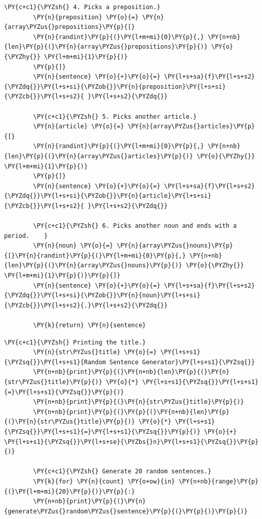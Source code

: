 \begin{tcolorbox}[breakable, size=fbox, boxrule=1pt, pad at break*=1mm,colback=cellbackground, colframe=cellborder]
\begin{Verbatim}[commandchars=\\\{\}]
		\PY{c+c1}{\PYZsh{} 4. Picks a preposition.}
		\PY{n}{preposition} \PY{o}{=} \PY{n}{array\PYZus{}prepositions}\PY{p}{[}
		\PY{n}{randint}\PY{p}{(}\PY{l+m+mi}{0}\PY{p}{,} \PY{n+nb}{len}\PY{p}{(}\PY{n}{array\PYZus{}prepositions}\PY{p}{)} \PY{o}{\PYZhy{}} \PY{l+m+mi}{1}\PY{p}{)}
		\PY{p}{]}
		\PY{n}{sentence} \PY{o}{+}\PY{o}{=} \PY{l+s+sa}{f}\PY{l+s+s2}{\PYZdq{}}\PY{l+s+si}{\PYZob{}}\PY{n}{preposition}\PY{l+s+si}{\PYZcb{}}\PY{l+s+s2}{ }\PY{l+s+s2}{\PYZdq{}}
		
		\PY{c+c1}{\PYZsh{} 5. Picks another article.}
		\PY{n}{article} \PY{o}{=} \PY{n}{array\PYZus{}articles}\PY{p}{[}
		\PY{n}{randint}\PY{p}{(}\PY{l+m+mi}{0}\PY{p}{,} \PY{n+nb}{len}\PY{p}{(}\PY{n}{array\PYZus{}articles}\PY{p}{)} \PY{o}{\PYZhy{}} \PY{l+m+mi}{1}\PY{p}{)}
		\PY{p}{]}
		\PY{n}{sentence} \PY{o}{+}\PY{o}{=} \PY{l+s+sa}{f}\PY{l+s+s2}{\PYZdq{}}\PY{l+s+si}{\PYZob{}}\PY{n}{article}\PY{l+s+si}{\PYZcb{}}\PY{l+s+s2}{ }\PY{l+s+s2}{\PYZdq{}}    
		
		\PY{c+c1}{\PYZsh{} 6. Picks another noun and ends with a period.    }
		\PY{n}{noun} \PY{o}{=} \PY{n}{array\PYZus{}nouns}\PY{p}{[}\PY{n}{randint}\PY{p}{(}\PY{l+m+mi}{0}\PY{p}{,} \PY{n+nb}{len}\PY{p}{(}\PY{n}{array\PYZus{}nouns}\PY{p}{)} \PY{o}{\PYZhy{}} \PY{l+m+mi}{1}\PY{p}{)}\PY{p}{]}
		\PY{n}{sentence} \PY{o}{+}\PY{o}{=} \PY{l+s+sa}{f}\PY{l+s+s2}{\PYZdq{}}\PY{l+s+si}{\PYZob{}}\PY{n}{noun}\PY{l+s+si}{\PYZcb{}}\PY{l+s+s2}{.}\PY{l+s+s2}{\PYZdq{}}    
		
		\PY{k}{return} \PY{n}{sentence}
	\end{Verbatim}
\end{tcolorbox}

\begin{tcolorbox}[breakable, size=fbox, boxrule=1pt, pad at break*=1mm,colback=cellbackground, colframe=cellborder]
	\begin{Verbatim}[commandchars=\\\{\}]
		\PY{c+c1}{\PYZsh{} Printing the title.}
		\PY{n}{str\PYZus{}title} \PY{o}{=} \PY{l+s+s1}{\PYZsq{}}\PY{l+s+s1}{Random Sentence Generator}\PY{l+s+s1}{\PYZsq{}}
		\PY{n+nb}{print}\PY{p}{(}\PY{n+nb}{len}\PY{p}{(}\PY{n}{str\PYZus{}title}\PY{p}{)} \PY{o}{*} \PY{l+s+s1}{\PYZsq{}}\PY{l+s+s1}{=}\PY{l+s+s1}{\PYZsq{}}\PY{p}{)}
		\PY{n+nb}{print}\PY{p}{(}\PY{n}{str\PYZus{}title}\PY{p}{)}
		\PY{n+nb}{print}\PY{p}{(}\PY{p}{(}\PY{n+nb}{len}\PY{p}{(}\PY{n}{str\PYZus{}title}\PY{p}{)} \PY{o}{*} \PY{l+s+s1}{\PYZsq{}}\PY{l+s+s1}{=}\PY{l+s+s1}{\PYZsq{}}\PY{p}{)} \PY{o}{+} \PY{l+s+s1}{\PYZsq{}}\PY{l+s+se}{\PYZbs{}n}\PY{l+s+s1}{\PYZsq{}}\PY{p}{)}
		
		\PY{c+c1}{\PYZsh{} Generate 20 random sentences.}
		\PY{k}{for} \PY{n}{count} \PY{o+ow}{in} \PY{n+nb}{range}\PY{p}{(}\PY{l+m+mi}{20}\PY{p}{)}\PY{p}{:}
		\PY{n+nb}{print}\PY{p}{(}\PY{n}{generate\PYZus{}random\PYZus{}sentence}\PY{p}{(}\PY{p}{)}\PY{p}{)}
	\end{Verbatim}
\end{tcolorbox}

